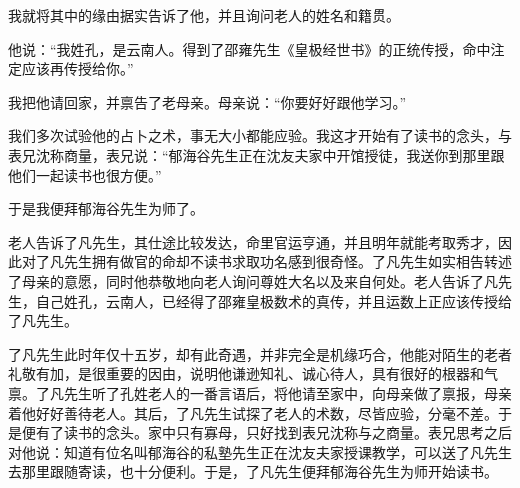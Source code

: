 \documentclass[12pt,UTF8]{ctexbook}
\begin{document}
我就将其中的缘由据实告诉了他，并且询问老人的姓名和籍贯。

他说：“我姓孔，是云南人。得到了邵雍先生《皇极经世书》的正统传授，命中注定应该再传授给你。”

我把他请回家，并禀告了老母亲。母亲说：“你要好好跟他学习。”

我们多次试验他的占卜之术，事无大小都能应验。我这才开始有了读书的念头，与表兄沈称商量，表兄说：“郁海谷先生正在沈友夫家中开馆授徒，我送你到那里跟他们一起读书也很方便。”

于是我便拜郁海谷先生为师了。

老人告诉了凡先生，其仕途比较发达，命里官运亨通，并且明年就能考取秀才，因此对了凡先生拥有做官的命却不读书求取功名感到很奇怪。了凡先生如实相告转述了母亲的意愿，同时他恭敬地向老人询问尊姓大名以及来自何处。老人告诉了凡先生，自己姓孔，云南人，已经得了邵雍皇极数术的真传，并且运数上正应该传授给了凡先生。

了凡先生此时年仅十五岁，却有此奇遇，并非完全是机缘巧合，他能对陌生的老者礼敬有加，是很重要的因由，说明他谦逊知礼、诚心待人，具有很好的根器和气禀。了凡先生听了孔姓老人的一番言语后，将他请至家中，向母亲做了禀报，母亲着他好好善待老人。其后，了凡先生试探了老人的术数，尽皆应验，分毫不差。于是便有了读书的念头。家中只有寡母，只好找到表兄沈称与之商量。表兄思考之后对他说：知道有位名叫郁海谷的私塾先生正在沈友夫家授课教学，可以送了凡先生去那里跟随寄读，也十分便利。于是，了凡先生便拜郁海谷先生为师开始读书。
\end{document}
